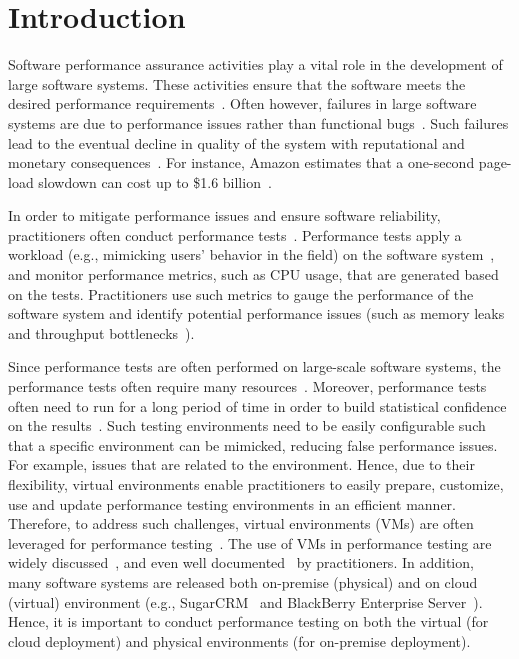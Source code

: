 \documentclass[smallextended]{svjour3}       %
\begin{document}
\section{Introduction}

Software performance assurance activities play a vital role in the development of large software systems. These activities ensure that the software meets the desired performance requirements~\cite{futureofspe}. Often however, failures in large software systems are due to performance issues rather than functional bugs~\cite{tailatscale, foo2010mining}. Such failures lead to the eventual decline in quality of the system with reputational and monetary consequences~\cite{costofdowntime}. For instance, Amazon estimates that a one-second page-load slowdown can cost up to \$1.6 billion~\cite{amazononesec}. 

In order to mitigate performance issues and ensure software reliability, practitioners often conduct performance tests~\cite{futureofspe}. Performance tests apply a workload (e.g., mimicking users' behavior in the field) on the software system~\cite{ranjanbook,Syer2016}, and monitor performance metrics, such as CPU usage, that are generated based on the tests. Practitioners use such metrics to gauge the performance of the software system and identify potential performance issues (such as memory leaks~\cite{markicsm2013} and throughput bottlenecks~\cite{5635038}).

Since performance tests are often performed on large-scale software systems, the performance tests often require many resources~\cite{ranjanbook}. Moreover, performance tests often need to run for a long period of time in order to build statistical confidence on the results~\cite{ranjanbook}. Such testing environments need to be easily configurable such that a specific environment can be mimicked, reducing false performance issues. For example, issues that are related to the environment. Hence, due to their flexibility, virtual environments enable practitioners to easily prepare, customize, use and update performance testing environments in an efficient manner. Therefore, to address such challenges, virtual environments (VMs) are often leveraged for performance testing~\cite{whyvirtualisbetter, vmwarehighcost}. The use of VMs in performance testing are widely discussed~\cite{performanceonvvirtual, stackoverflow, windowsserver}, and even well documented~\cite{sugarcrmexp} by practitioners. In addition, many software systems are released both on-premise (physical) and on cloud (virtual) environment (e.g., SugarCRM~\cite{sugarcrm} and BlackBerry Enterprise Server~\cite{bes}). Hence, it is important to conduct performance testing on both the virtual (for cloud deployment) and physical environments (for on-premise deployment).
\end{document}
